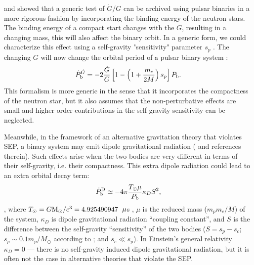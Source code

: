 \citealt{lwj+09} and \citealt{fwe+12} showed that a generic test of $\dot{G}/G$ can be archived using pulsar
binaries in a more rigorous fashion by incorporating the binding energy of the neutron stars.
The binding energy of a compact start changes with the $G$, resulting in a changing mass, this will also affect the binary orbit.
In a generic form, we could characterize this effect using a self-gravity "sensitivity" parameter $s_p$ \citep{Will93}.
The changing $G$ will now change the orbital period of a pulsar binary system \citep{nor90, lwj+09}:
\begin{equation}
\dot{P}_{\rm b}^{\dot{G}} = -2 \frac{\dot{G}}{G}
\left[1-\left( 1+\frac{m_c}{2M}\right) s_p\right]P_{\rm b}.
\end{equation}
This formalism is more generic in the sense that it incorporates the compactness of the neutron star, 
but it also assumes that the non-perturbative effects are small
and higher order contributions in the self-gravity sensitivity can be neglected.

Meanwhile, in the framework of an alternative gravitation theory that violates
SEP, a binary system may emit dipole gravitational radiation (\citealt{Will93, Will01, lwj+09, fwe+12} and references
therein). Such effects arise when the two bodies are very different in terms
of their self-gravity, i.e.  their compactness.
This extra dipole radiation could lead to an extra orbital decay term:
\begin{equation}
\dot{P}_{\rm b}^{\rm D} \simeq -4\pi\frac{T_{\odot}\mu}{P_{\rm b}}\kappa_D S^2,
\end{equation}
\citep{Will93,lwj+09}, where $T_{\odot}=G{\rm M_{\odot}}/c^3=4.925490947$~${\rm
\mu}$s \citep{lk05}, $\mu$ is the reduced mass ($m_pm_c/M$) of the system, $\kappa_D$ is dipole
gravitational radiation ``coupling constant'', and $S$ is the difference
between the self-gravity ``sensitivity'' of the two bodies ($S = s_p - s_c$;
$s_p\sim0.1m_p/M_{\odot}$ according to \citealt{de92} ; and $s_c\ll s_p$).
In Einstein's general relativity $\kappa_D=0$ --- there is no self-gravity induced
dipole gravitational radiation, but it is often not the case in alternative
theories that violate the SEP.

